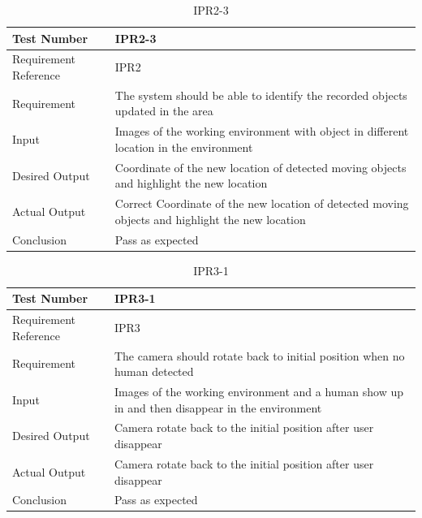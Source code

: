 \documentclass[12pt, titlepage]{article}
\begin{document}
\begin{table}[H]
\begin{center}
\begin{tabular}{|l | m{9cm}|}
\hline
  Test Number & IPR2-3\\
  \hline
  Requirement Reference & IPR2\\
  \hline
  Requirement & The system should be able to identify the recorded objects updated in the area\\
  \hline
  Input & Images of the working environment with object in different location in the environment\\
  \hline
  Desired Output & Coordinate of the new location of detected moving objects and highlight the new location\\
  \hline
  Actual Output & Correct Coordinate of the new location of detected moving objects and highlight the new location\\
  \hline
  Conclusion & Pass as expected\\
  \hline
\end{tabular}
\end{center}
\caption{IPR2-3}
\end{table}

\begin{table}[H]
\begin{center}
\begin{tabular}{|l | m{9cm}|}
\hline
  Test Number & IPR3-1\\
  \hline
  Requirement Reference & IPR3\\
  \hline
  Requirement &  The camera should rotate back to initial position when no human detected\\
  \hline
  Input & Images of the working environment and a human show up in and then disappear in
the environment\\
  \hline
  Desired Output & Camera rotate back to the initial position after user disappear\\
  \hline
  Actual Output & Camera rotate back to the initial position after user disappear\\
  \hline
  Conclusion & Pass as expected\\
  \hline
\end{tabular}
\end{center}   
\caption{IPR3-1}
\end{table}
\end{document}
